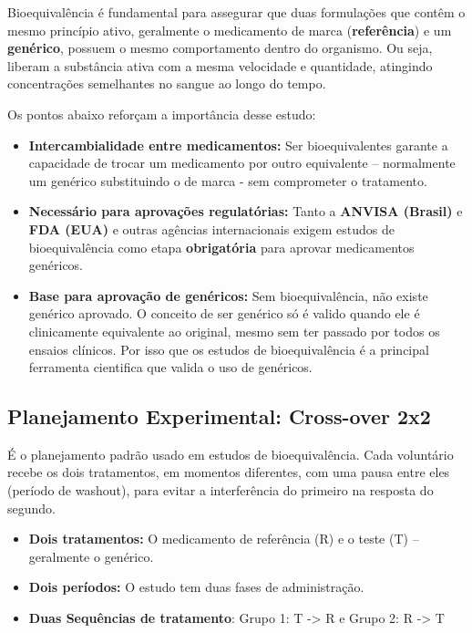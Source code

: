 \documentclass[
]{article}
\providecommand{\tightlist}{%
  \setlength{\itemsep}{0pt}\setlength{\parskip}{0pt}}
\begin{document}
Bioequivalência é fundamental para assegurar que duas formulações que
contêm o mesmo princípio ativo, geralmente o medicamento de marca
(\textbf{referência}) e um \textbf{genérico}, possuem o mesmo
comportamento dentro do organismo. Ou seja, liberam a substância ativa
com a mesma velocidade e quantidade, atingindo concentrações semelhantes
no sangue ao longo do tempo.

Os pontos abaixo reforçam a importância desse estudo:

\begin{itemize}
\tightlist
\item
  \textbf{Intercambialidade entre medicamentos:} Ser bioequivalentes
  garante a capacidade de trocar um medicamento por outro equivalente --
  normalmente um genérico substituindo o de marca - sem comprometer o
  tratamento.
\item
  \textbf{Necessário para aprovações regulatórias:} Tanto a
  \textbf{ANVISA (Brasil)} e \textbf{FDA (EUA)} e outras agências
  internacionais exigem estudos de bioequivalência como etapa
  \textbf{obrigatória} para aprovar medicamentos genéricos.
\item
  \textbf{Base para aprovação de genéricos:} Sem bioequivalência, não
  existe genérico aprovado. O conceito de ser genérico só é valido
  quando ele é clinicamente equivalente ao original, mesmo sem ter
  passado por todos os ensaios clínicos. Por isso que os estudos de
  bioequivalência é a principal ferramenta cientifica que valida o uso
  de genéricos.
\end{itemize}

\hypertarget{planejamento-experimental-cross-over-2x2}{%
\subsection{Planejamento Experimental: Cross-over
2x2}\label{planejamento-experimental-cross-over-2x2}}

É o planejamento padrão usado em estudos de bioequivalência. Cada
voluntário recebe os dois tratamentos, em momentos diferentes, com uma
pausa entre eles (período de washout), para evitar a interferência do
primeiro na resposta do segundo.

\begin{itemize}
\tightlist
\item
  \textbf{Dois tratamentos:} O medicamento de referência (R) e o teste
  (T) -- geralmente o genérico.
\item
  \textbf{Dois períodos:} O estudo tem duas fases de administração.
\item
  \textbf{Duas Sequências de tratamento}: Grupo 1: T -\textgreater{} R e
  Grupo 2: R -\textgreater{} T
\end{itemize}
\end{document}
